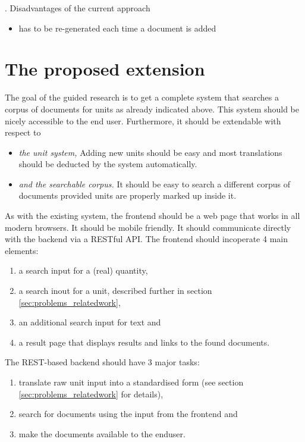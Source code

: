 \documentclass[11pt]{article}
\begin{document}
.
Disadvantages of the current approach
\begin{itemize}
  \item has to be re-generated each time a document is added
\end{itemize}

\section{The proposed extension}
\label{sec:extension}

The goal of the guided research is to get a complete system that searches a corpus of documents for units as already indicated above. This system should be nicely accessible to the end user. Furthermore, it should be extendable with respect to
\begin{itemize}
  \item \textit{the unit system, } Adding new units should be easy and most translations should be deducted by the system automatically.
  \item \textit{and the searchable corpus. } It should be easy to search a different corpus of documents provided units are properly marked up inside it.
\end{itemize}

As with the existing system, the frontend should be a web page that works in all modern browsers. It should be mobile friendly. It should communicate directly with the backend via a RESTful API. The frontend should incoperate 4 main elements:

\begin{enumerate}
  \item a search input for a (real) quantity,
  \item a search inout for a unit, described further in section \ref{sec:problems_relatedwork},
  \item an additional search input for text and
  \item a result page that displays results and links to the found documents.
\end{enumerate}

\noindent The REST-based backend should have 3 major tasks:

\begin{enumerate}
  \item translate raw unit input into a standardised form (see section \ref{sec:problems_relatedwork} for details),
  \item search for documents using the input from the frontend and
  \item make the documents available to the enduser.
\end{enumerate}
\end{document}
